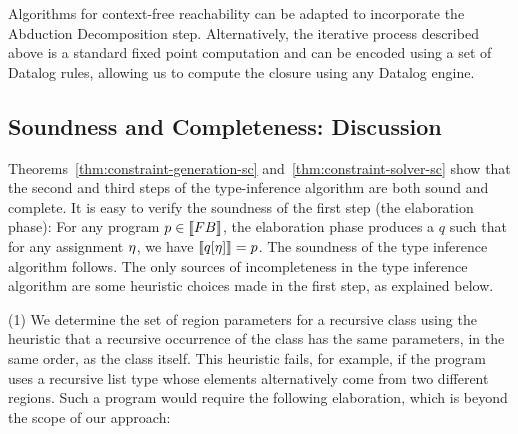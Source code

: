 Algorithms for context-free reachability can be adapted to incorporate the Abduction Decomposition step.
Alternatively, the iterative process described above is a standard fixed point computation
and can be encoded using a set of Datalog rules, allowing us to compute the closure
using any Datalog engine.

\subsection{Soundness and Completeness: Discussion}

Theorems~\ref{thm:constraint-generation-sc} and~\ref{thm:constraint-solver-sc}
show that the second and third steps of the type-inference algorithm are both
sound and complete.
It is easy to verify the soundness of the first step (the elaboration phase):
For any program $p \in \llbracket {\sc FB} \rrbracket$, the elaboration phase produces a $q$
such that for any assignment $\eta$, we have $\llbracket q[\eta] \rrbracket = p$.
%
The soundness of the type inference algorithm follows.
The only sources of incompleteness in the type inference algorithm are some heuristic
choices made in the first step, as explained below.





  (1) We determine the set of region parameters for a recursive class
using the heuristic that a recursive occurrence of the class has
the same parameters, in the same order, as the class itself.
This heuristic fails, for example, if the program uses a recursive list type whose
elements alternatively come from two different regions. Such a program would require
the following elaboration, which is beyond the scope of our approach:

